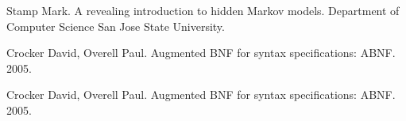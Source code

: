\begin{thebibliography}{99}
  Stamp Mark.
  A revealing introduction to hidden Markov models.
  Department of Computer Science San Jose State University.

  Crocker David, Overell Paul. 
  Augmented BNF for syntax specifications: ABNF. 
  2005.

  Crocker David, Overell Paul. 
  Augmented BNF for syntax specifications: ABNF. 
  2005.

\end{thebibliography}

